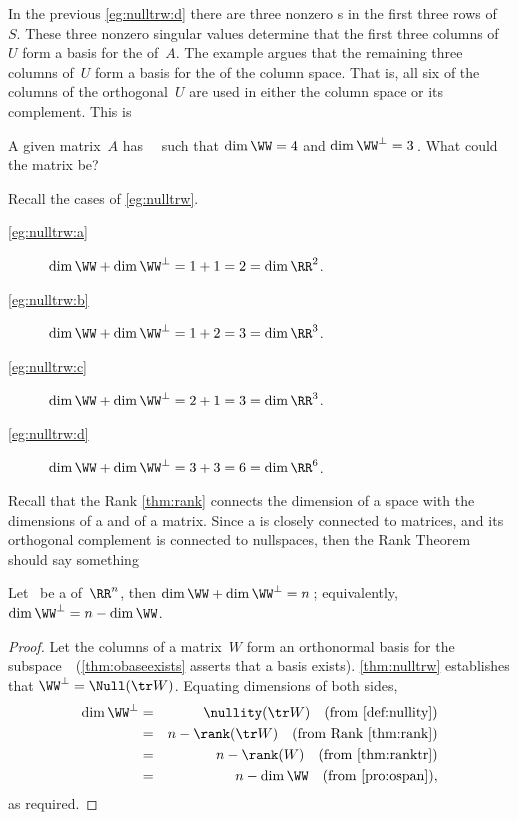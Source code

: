 In the previous \cref{eg:nulltrw:d} there are three nonzero s in the first three rows of~\(S\).
These three nonzero singular values determine that the first three columns of~\(U\) form a basis for the  of~\(A\).
The example argues that the remaining three columns of~\(U\) form a basis for the  of the column space.
That is, all six of the columns of the orthogonal~\(U\) are used in either the column space or its complement.
This is 

\begin{activity}
A given matrix~\(A\) has ~\WW\ such that \(\dim\WW=4\) and \(\dim\WW^\perp=3\)\,.  
What  could the matrix be?
\end{activity}



\begin{example} \label{eg:orthrank}
Recall the cases of \cref{eg:nulltrw}.
\begin{description}
\item[\ref{eg:nulltrw:a}] \(\dim\WW+\dim\WW^\perp=1+1=2=\dim\RR^2\).
\item[\ref{eg:nulltrw:b}] \(\dim\WW+\dim\WW^\perp=1+2=3=\dim\RR^3\).
\item[\ref{eg:nulltrw:c}] \(\dim\WW+\dim\WW^\perp=2+1=3=\dim\RR^3\).
\item[\ref{eg:nulltrw:d}] \(\dim\WW+\dim\WW^\perp=3+3=6=\dim\RR^6\).
\end{description}
\end{example}

Recall that the Rank \cref{thm:rank} connects the  dimension of a space with the dimensions of a  and  of a matrix.
Since a  is closely connected to matrices, and its orthogonal complement is connected to nullspaces, then the Rank Theorem should say something 



\begin{theorem} \label{thm:orthrank}
Let \WW\ be a  of~\(\RR^n\), then \(\dim\WW+\dim\WW^\perp=n\)\,; equivalently, \(\dim\WW^\perp=n-\dim\WW\).
\end{theorem}

\begin{proof} 
Let the columns of a matrix~\(W\) form an orthonormal basis for the subspace~\WW\ (\cref{thm:obaseexists} asserts that a basis exists).
\cref{thm:nulltrw} establishes that \(\WW^\perp=\Null(\tr W)\).
Equating dimensions of both sides, 
\begin{eqnarray*}
\dim\WW^\perp&=&\nullity(\tr W) 
\quad(\text{from \cref{def:nullity}})
\\&=&n-\rank(\tr W)
\quad(\text{from Rank \cref{thm:rank}})
\\&=&n-\rank(W)
\quad(\text{from \cref{thm:ranktr}})
\\&=&n-\dim\WW
\quad(\text{from \cref{pro:ospan}}),
\end{eqnarray*}
as required.
\end{proof}


